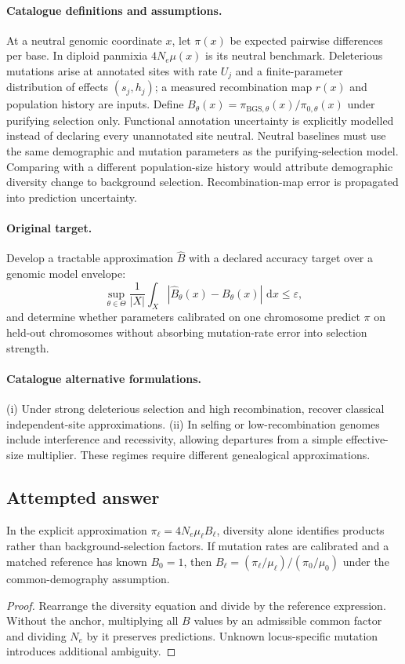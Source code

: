 \documentclass[11pt]{article}
\begin{document}
\paragraph{Catalogue definitions and assumptions.}
At a neutral genomic coordinate $x$, let $\pi(x)$ be expected pairwise differences per base. In diploid panmixia $4N_e\mu(x)$ is its neutral benchmark. Deleterious mutations arise at annotated sites with rate $U_j$ and a finite-parameter distribution of effects $(s_j,h_j)$; a measured recombination map $r(x)$ and population history are inputs. Define $B_\theta(x)=\pi_{\mathrm{BGS},\theta}(x)/\pi_{0,\theta}(x)$ under purifying selection only. Functional annotation uncertainty is explicitly modelled instead of declaring every unannotated site neutral. Neutral baselines must use the same demographic and mutation parameters as the purifying-selection model. Comparing with a different population-size history would attribute demographic diversity change to background selection. Recombination-map error is propagated into prediction uncertainty.
\paragraph{Original target.}
Develop a tractable approximation $\widehat B$ with a declared accuracy target over a genomic model envelope:
\[
 \sup_{\theta\in\Theta}\frac1{|X|}
 \int_X |\widehat B_\theta(x)-B_\theta(x)|\,\,\mathrm{d} x\le\varepsilon,
\]
and determine whether parameters calibrated on one chromosome predict $\pi$ on held-out chromosomes without absorbing mutation-rate error into selection strength.
\paragraph{Catalogue alternative formulations.}
(i) Under strong deleterious selection and high recombination, recover classical independent-site approximations. (ii) In selfing or low-recombination genomes include interference and recessivity, allowing departures from a simple effective-size multiplier. These regimes require different genealogical approximations.
\subsection{Attempted answer}
\begin{proposition}
In the explicit approximation $\pi_\ell=4N_e\mu_\ell B_\ell$, diversity alone identifies products rather than background-selection factors. If mutation rates are calibrated and a matched reference has known $B_0=1$, then $B_\ell=(\pi_\ell/\mu_\ell)/(\pi_0/\mu_0)$ under the common-demography assumption.
\end{proposition}
\begin{proof}
Rearrange the diversity equation and divide by the reference expression. Without the anchor, multiplying all $B$ values by an admissible common factor and dividing $N_e$ by it preserves predictions. Unknown locus-specific mutation introduces additional ambiguity.
\end{proof}
\end{document}
